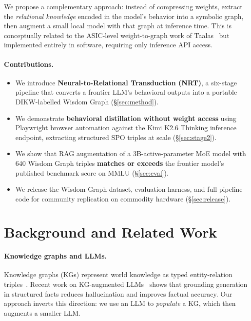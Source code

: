 \documentclass[11pt]{article}
\begin{document}
We propose a complementary approach: instead of compressing weights, extract
the \emph{relational knowledge} encoded in the model's behavior into a
symbolic graph, then augment a small local model with that graph at
inference time.
This is conceptually related to the ASIC-level weight-to-graph work of
Taalas~\citep{taalas2025} but implemented entirely in software, requiring only
inference API access.

\paragraph{Contributions.}
\begin{itemize}
  \item We introduce \textbf{Neural-to-Relational Transduction (NRT)}, a
        six-stage pipeline that converts a frontier LLM's behavioral outputs
        into a portable DIKW-labelled Wisdom Graph (\S\ref{sec:method}).
  \item We demonstrate \textbf{behavioral distillation without weight access}
        using Playwright browser automation against the Kimi K2.6 Thinking
        inference endpoint, extracting structured SPO triples at scale
        (\S\ref{sec:stage2}).
  \item We show that RAG augmentation of a 3B-active-parameter MoE model with
        640 Wisdom Graph triples \textbf{matches or exceeds} the frontier
        model's published benchmark score on MMLU (\S\ref{sec:eval}).
  \item We release the Wisdom Graph dataset, evaluation harness, and full
        pipeline code for community replication on commodity hardware
        (\S\ref{sec:release}).
\end{itemize}

\section{Background and Related Work}
\label{sec:related}

\paragraph{Knowledge graphs and LLMs.}
Knowledge graphs (KGs) represent world knowledge as typed entity-relation
triples~\citep{vrandevcic2014wikidata,pellissier2016freebase}.
Recent work on KG-augmented LLMs~\citep{edge2024graphrag,pan2024unifying}
shows that grounding generation in structured facts reduces hallucination and
improves factual accuracy.
Our approach inverts this direction: we use an LLM to \emph{populate} a KG,
which then augments a smaller LLM.
\end{document}
